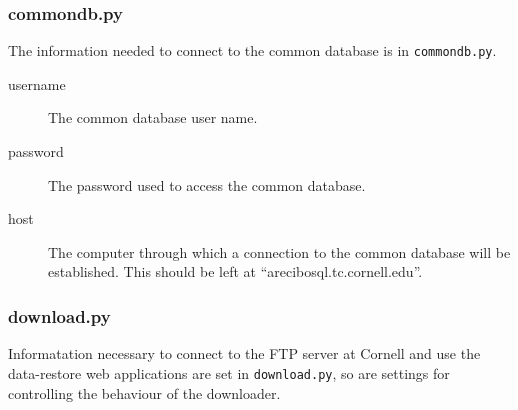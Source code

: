 \subsubsection{commondb.py}
The information needed to connect to the common database is in \texttt{commondb.py}.

\begin{description}
    \item[username] The common database user name.
    \item[password] The password used to access the common database.
    \item[host] The computer through which a connection to the common database will be established. This should be left at ``arecibosql.tc.cornell.edu''.
\end{description}


\subsubsection{download.py}
Informatation necessary to connect to the FTP server at Cornell and use the data-restore web applications are set in \texttt{download.py}, so are settings for controlling the behaviour of the downloader.

